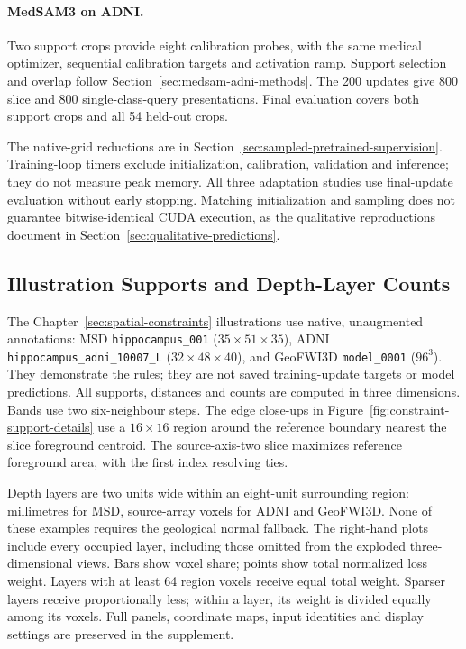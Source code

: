 \documentclass[12pt,a4paper]{article}
\begin{document}
\paragraph{MedSAM3 on ADNI.}\label{sec:medsam-adni-methods-details}
Two support crops provide eight calibration probes, with the same
medical optimizer, sequential calibration targets and activation ramp.
Support selection and overlap follow
Section~\ref{sec:medsam-adni-methods}. The 200 updates give 800 slice
and 800 single-class-query presentations. Final evaluation covers both
support crops and all 54 held-out crops.

The native-grid reductions are in
Section~\ref{sec:sampled-pretrained-supervision}. Training-loop timers
exclude initialization, calibration, validation and inference; they do
not measure peak memory. All three adaptation studies use final-update
evaluation without early stopping. Matching initialization and sampling
does not guarantee bitwise-identical CUDA execution, as the qualitative
reproductions document in Section~\ref{sec:qualitative-predictions}.

\subsection{Illustration Supports and Depth-Layer Counts}
\label{sec:dataset-constraint-examples}

The Chapter~\ref{sec:spatial-constraints} illustrations use native,
unaugmented annotations: MSD \texttt{hippocampus\_001} ($35\times51\times35$),
ADNI \texttt{hippocampus\_adni\_10007\_L} ($32\times48\times40$),
and GeoFWI3D \texttt{model\_0001} ($96^3$). They demonstrate the rules;
they are not saved training-update targets or model predictions.
All supports, distances and counts are computed in three dimensions.
Bands use two six-neighbour steps. The edge close-ups in
Figure~\ref{fig:constraint-support-details} use a $16\times16$ region
around the reference boundary nearest the slice foreground centroid.
The source-axis-two slice maximizes reference foreground area, with
the first index resolving ties.

Depth layers are two units wide within an eight-unit surrounding region:
millimetres for MSD, source-array voxels for ADNI and GeoFWI3D. None of
these examples requires the geological normal fallback. The right-hand
plots include every occupied layer, including those omitted from the
exploded three-dimensional views. Bars show voxel share; points show
total normalized loss weight. Layers with at least 64 region voxels
receive equal total weight. Sparser layers receive proportionally less;
within a layer, its weight is divided equally among its voxels. Full
panels, coordinate maps, input identities and display settings are
preserved in the supplement.
\end{document}
